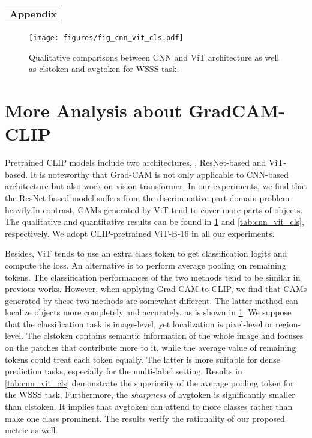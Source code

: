 \documentclass[10pt,twocolumn,letterpaper]{article}
\begin{document}
\appendix
\renewcommand\thefigure{S\arabic{figure}}
\renewcommand\thetable{S\arabic{table}}


\setcounter{figure}{0}
\setcounter{table}{0}

\vspace{-8mm}

\begin{strip}
\begin{center}
  \begin{tabular}{l}
  \LARGE \textbf{Appendix} \\
  \end{tabular}
\end{center}
\end{strip}

\raggedend

\begin{figure}[t]
  \centering
\texttt{[image: figures/fig\_cnn\_vit\_cls.pdf]}

   \caption{Qualitative comparisons between CNN and ViT architecture as well as clstoken and avgtoken for WSSS task.}
   \label{fig:cnn_vit_cls}
\end{figure}

\section{More Analysis about GradCAM-CLIP}
Pretrained CLIP models include two architectures, \ie, ResNet-based and ViT-based. It is noteworthy that Grad-CAM is not only applicable to CNN-based architecture but also work on vision transformer. In our experiments, we find that the ResNet-based model suffers from the discriminative part domain problem heavily.In contrast, CAMs generated by ViT tend to cover more parts of objects. The qualitative and quantitative results can be found in \cref{fig:cnn_vit_cls} and \cref{tab:cnn_vit_cls}, respectively. We adopt CLIP-pretrained ViT-B-16 in all our experiments.

Besides, ViT\cite{dosovitskiy2020vit} tends to use an extra class token to get classification logits and compute the loss. An alternative is to perform average pooling on remaining tokens. The classification performances of the two methods tend to be similar in previous works. However, when applying Grad-CAM to CLIP, we find that CAMs generated by these two methods are somewhat different. The latter method can localize objects more completely and accurately, as is shown in \cref{fig:cnn_vit_cls}. We suppose that the classification task is image-level, yet localization is pixel-level or region-level. The clstoken contains semantic information of the whole image and focuses on the patches that contribute more to it, while the average value of remaining tokens could treat each token equally. The latter is more suitable for dense prediction tasks, especially for the multi-label setting. Results in \cref{tab:cnn_vit_cls} demonstrate the superiority of the average pooling token for the WSSS task. Furthermore, the \textit{sharpness} of avgtoken is significantly smaller than clstoken. It implies that avgtoken can attend to more classes rather than make one class prominent. The results verify the rationality of our proposed metric as well.
\end{document}
